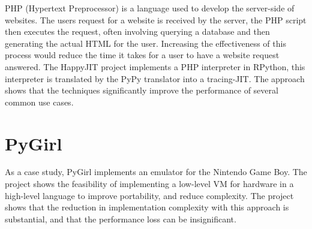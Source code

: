 PHP (Hypertext Preprocessor) is a language used to develop the server-side of 
websites. The users request for a website is received by the server, the PHP script
then executes the request, often involving querying a database and then generating 
the actual HTML for the user. Increasing the effectiveness of this process would
reduce the time it takes for a user to have a website request answered. 
The HappyJIT project implements a PHP interpreter in RPython, this interpreter is 
translated by the PyPy translator into a tracing-JIT. The approach shows that 
the techniques significantly improve the performance of several common use cases.
\cite{homescu2011happyjit}

\section{PyGirl}

As a case study, PyGirl implements an emulator for the Nintendo Game Boy. The project 
shows the feasibility of implementing a low-level VM for hardware in a high-level 
language to improve portability, and reduce complexity. The project shows that the
reduction in implementation complexity with this approach is substantial, 
and that the performance loss can be insignificant.
\cite{bruni2009pygirl}



